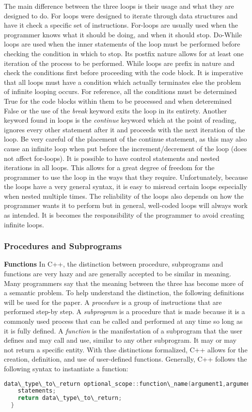 \documentclass[12pt]{article}
\begin{document}
The main difference between the three loops is their usage and what they are designed to do. For loops were designed to iterate through data structures and have it check a specific set of instructions. For-loops are usually used when the programmer knows what it should be doing, and when it should stop. Do-While loops are used when the inner statements of the loop must be performed before checking the condition in which to stop. Its postfix nature allows for at least one iteration of the process to be performed. While loops are prefix in nature and check the conditions first before proceeding with the code block. It is imperative that all loops must have a condition which actually terminates else the problem of infinite looping occurs. For reference, all the conditions must be determined True for the code blocks within them to be processed and when deteremined False or the use of the \textit{break} keyword exits the loop in its entirety. Another keyword found in loops is the \textit{continue} keyword which at the point of reading, ignores every other statement after it and proceeds with the next iteration of the loop. Be very careful of the placement of the continue statement, as this may also cause an infinite loop when put before the increment/decrement of the loop (does not affect for-loops). It is possible to have control statements and nested iterations in all loops. This allows for a great degree of freedom for the programmer to use the loop in the ways that they require. Unfortunately, because the loops have a very general syntax, it is easy to misread certain loops especially when nested multiple times. The reliability of the loops also depends on how the programmer wants it to perform but in general, well-coded loops will always work as intended. It is becomes the responsibility of the programmer to avoid creating infinite loops.

\subsubsection{Procedures and Subprograms}
\textbf{Functions} In C++, the distinction between procedure, subprograms and functions are very hazy and are generally accepted to be similar in meaning. Many programmers say that the meaning between the three has become more of a semantic problem. To help understand the distinction, the following definitions will be used for the paper. A \textit{procedure} is a group of instructions that are performed step-by step. A \textit{subprogram} is a procedure that is made because it is a commonly used process that can be called and performed at any time so long as it is fully defined. A \textit{function} is the manifestation of a subprogram that the user defines and may call and use, similar to any other subprogram. It may or may not return a specific entity. With thse distinctions formalized, C++ allows for the creation, definition, and use of user-defined functions. Generally, C++ follows the following syntax to instantiate a function:
\begin{lstlisting}[language=C++]
  data\_type\_to\_return optional_scope::function\_name(argument1,argument2,...,argumentn){
    statements;
    return data\_type\_to\_return;
  }
\end{lstlisting}
\end{document}
